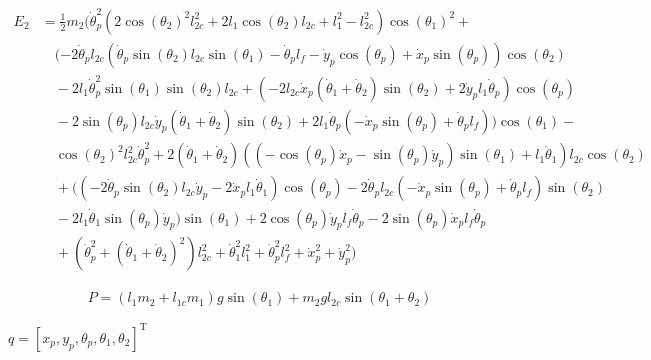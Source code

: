 \documentclass{article}
\begin{document}
\begin{equation}
	\begin{aligned}
		E_2 &= \frac{1}{2} m_2 (\dot \theta_p^2 (2 \cos(\theta_2)^2 l_{2c}^2 + 2 l_1 \cos(\theta_2) l_{2c} + l_1^2 - l_{2c}^2) \cos(\theta_1)^2 +\\
		&\quad  (-2 \dot \theta_p l_{2c} (\dot \theta_p \sin(\theta_2) l_{2c} \sin(\theta_1) - \dot \theta_p l_f - \dot y_p \cos(\theta_p) + \dot x_p \sin(\theta_p)) \cos(\theta_2) \\
		&\quad - 2 l_1 \dot \theta_p^2 \sin(\theta_1) \sin(\theta_2) l_{2c} + (-2 l_{2c} \dot x_p (\dot \theta_1 + \dot \theta_2) \sin(\theta_2) + 2 \dot y_p l_1 \dot \theta_p) \cos(\theta_p) \\
		&\quad - 2 \sin(\theta_p) l_{2c} \dot y_p (\dot \theta_1 + \dot \theta_2) \sin(\theta_2) + 2 l_1 \dot \theta_p (-\dot x_p \sin(\theta_p) + \dot \theta_p l_f)) \cos(\theta_1) - \\
		&\quad \cos(\theta_2)^2 l_{2c}^2 \dot \theta_p^2 + 2 (\dot \theta_1 + \dot \theta_2) ((-\cos(\theta_p) \dot x_p - \sin(\theta_p) \dot y_p) \sin(\theta_1) + l_1 \dot \theta_1) l_{2c} \cos(\theta_2)\\
		&\quad  + ((-2 \dot \theta_p \sin(\theta_2) l_{2c} \dot y_p - 2 \dot x_p l_1 \dot \theta_1) \cos(\theta_p) - 2 \dot \theta_p l_{2c} (-\dot x_p \sin(\theta_p) + \dot \theta_p l_f) \sin(\theta_2) \\
		&\quad - 2 l_1 \dot \theta_1 \sin(\theta_p) \dot y_p) \sin(\theta_1) + 2 \cos(\theta_p) \dot y_p l_f \dot \theta_p - 2 \sin(\theta_p) \dot x_p l_f \dot \theta_p \\
		&\quad + (\dot \theta_p^2 + (\dot \theta_1 + \dot \theta_2)^2) l_{2c}^2 + \dot \theta_1^2 l_1^2 + \dot \theta_p^2 l_f^2 + \dot x_p^2 + \dot y_p^2) 
	\end{aligned}
\end{equation}

\begin{equation}
	\begin{aligned}
	P = (l_1 m_2 + l_{1c} m_1) g \sin(\theta_1) + m_2 g l_{2c} \sin(\theta_1 + \theta_2)
	\end{aligned}
\end{equation}

$q=[x_p,y_p,\theta_p,\theta_1,\theta_2]^{\text{T}}$
\end{document}
